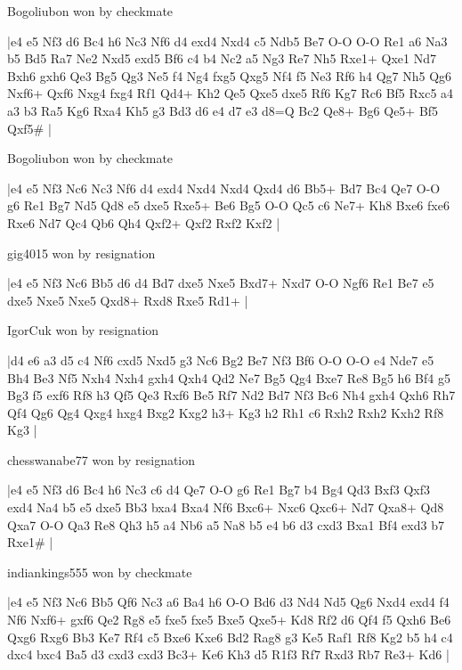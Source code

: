 Bogoliubon won by checkmate

\makegametitle
|e4 e5 Nf3 d6 Bc4 h6 Nc3 Nf6 d4 exd4 Nxd4 c5 Ndb5 Be7 O-O O-O Re1 a6 Na3 b5 Bd5 Ra7 Ne2 Nxd5 exd5 Bf6 c4 b4 Nc2 a5 Ng3 Re7 Nh5 Rxe1+ Qxe1 Nd7 Bxh6 gxh6 Qe3 Bg5 Qg3 Ne5 f4 Ng4 fxg5 Qxg5 Nf4 f5 Ne3 Rf6 h4 Qg7 Nh5 Qg6 Nxf6+ Qxf6 Nxg4 fxg4 Rf1 Qd4+ Kh2 Qe5 Qxe5 dxe5 Rf6 Kg7 Rc6 Bf5 Rxc5 a4 a3 b3 Ra5 Kg6 Rxa4 Kh5 g3 Bd3 d6 e4 d7 e3 d8=Q Bc2 Qe8+ Bg6 Qe5+ Bf5 Qxf5\#  |

\showboard

Bogoliubon won by checkmate

\makegametitle
|e4 e5 Nf3 Nc6 Nc3 Nf6 d4 exd4 Nxd4 Nxd4 Qxd4 d6 Bb5+ Bd7 Bc4 Qe7 O-O g6 Re1 Bg7 Nd5 Qd8 e5 dxe5 Rxe5+ Be6 Bg5 O-O Qc5 c6 Ne7+ Kh8 Bxe6 fxe6 Rxe6 Nd7 Qc4 Qb6 Qh4 Qxf2+ Qxf2 Rxf2 Kxf2  |

\showboard

gig4015 won by resignation

\makegametitle
|e4 e5 Nf3 Nc6 Bb5 d6 d4 Bd7 dxe5 Nxe5 Bxd7+ Nxd7 O-O Ngf6 Re1 Be7 e5 dxe5 Nxe5 Nxe5 Qxd8+ Rxd8 Rxe5 Rd1+  |

\showboard

IgorCuk won by resignation

\makegametitle
|d4 e6 a3 d5 c4 Nf6 cxd5 Nxd5 g3 Nc6 Bg2 Be7 Nf3 Bf6 O-O O-O e4 Nde7 e5 Bh4 Be3 Nf5 Nxh4 Nxh4 gxh4 Qxh4 Qd2 Ne7 Bg5 Qg4 Bxe7 Re8 Bg5 h6 Bf4 g5 Bg3 f5 exf6 Rf8 h3 Qf5 Qe3 Rxf6 Be5 Rf7 Nd2 Bd7 Nf3 Bc6 Nh4 gxh4 Qxh6 Rh7 Qf4 Qg6 Qg4 Qxg4 hxg4 Bxg2 Kxg2 h3+ Kg3 h2 Rh1 c6 Rxh2 Rxh2 Kxh2 Rf8 Kg3  |

\showboard

chesswanabe77 won by resignation

\makegametitle
|e4 e5 Nf3 d6 Bc4 h6 Nc3 c6 d4 Qe7 O-O g6 Re1 Bg7 b4 Bg4 Qd3 Bxf3 Qxf3 exd4 Na4 b5 e5 dxe5 Bb3 bxa4 Bxa4 Nf6 Bxc6+ Nxc6 Qxc6+ Nd7 Qxa8+ Qd8 Qxa7 O-O Qa3 Re8 Qh3 h5 a4 Nb6 a5 Na8 b5 e4 b6 d3 cxd3 Bxa1 Bf4 exd3 b7 Rxe1\#  |

\showboard

indiankings555 won by checkmate

\makegametitle
|e4 e5 Nf3 Nc6 Bb5 Qf6 Nc3 a6 Ba4 h6 O-O Bd6 d3 Nd4 Nd5 Qg6 Nxd4 exd4 f4 Nf6 Nxf6+ gxf6 Qe2 Rg8 e5 fxe5 fxe5 Bxe5 Qxe5+ Kd8 Rf2 d6 Qf4 f5 Qxh6 Be6 Qxg6 Rxg6 Bb3 Ke7 Rf4 c5 Bxe6 Kxe6 Bd2 Rag8 g3 Ke5 Raf1 Rf8 Kg2 b5 h4 c4 dxc4 bxc4 Ba5 d3 cxd3 cxd3 Bc3+ Ke6 Kh3 d5 R1f3 Rf7 Rxd3 Rb7 Re3+ Kd6  |

